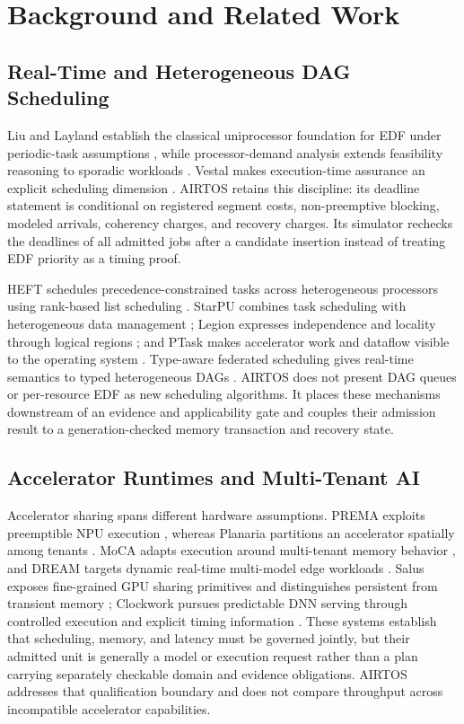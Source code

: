 \documentclass[lettersize,journal]{IEEEtran}
\begin{document}
\section{Background and Related Work}
\subsection{Real-Time and Heterogeneous DAG Scheduling}
Liu and Layland establish the classical uniprocessor foundation for EDF under
periodic-task assumptions \cite{liu1973scheduling}, while processor-demand
analysis extends feasibility reasoning to sporadic workloads
\cite{baruah1990preemptively}. Vestal makes execution-time assurance an
explicit scheduling dimension \cite{vestal2007preemptive}. AIRTOS retains this
discipline: its deadline statement is conditional on registered segment costs,
non-preemptive blocking, modeled arrivals, coherency charges, and recovery
charges. Its simulator rechecks the deadlines of all admitted jobs after a
candidate insertion instead of treating EDF priority as a timing proof.

HEFT schedules precedence-constrained tasks across heterogeneous processors
using rank-based list scheduling \cite{topcuoglu2002performanceeffective}.
StarPU combines task scheduling with heterogeneous data management
\cite{augonnet2011starpu}; Legion expresses independence and locality through
logical regions \cite{bauer2012legion}; and PTask makes accelerator work and
dataflow visible to the operating system \cite{rossbach2011ptask}. Type-aware
federated scheduling gives real-time semantics to typed heterogeneous DAGs
\cite{lin2022typeaware}. AIRTOS does not present DAG queues or per-resource EDF
as new scheduling algorithms. It places these mechanisms downstream of an
evidence and applicability gate and couples their admission result to a
generation-checked memory transaction and recovery state.

\subsection{Accelerator Runtimes and Multi-Tenant AI}
Accelerator sharing spans different hardware assumptions. PREMA exploits
preemptible NPU execution \cite{choi2020prema}, whereas Planaria partitions an
accelerator spatially among tenants \cite{ghodrati2020planaria}. MoCA adapts
execution around multi-tenant memory behavior \cite{kim2023moca}, and DREAM
targets dynamic real-time multi-model edge workloads \cite{kim2023dream}.
Salus exposes fine-grained GPU sharing primitives and distinguishes persistent
from transient memory \cite{yu2019salus}; Clockwork pursues predictable DNN
serving through controlled execution and explicit timing information
\cite{gujarati2020serving}. These systems establish that scheduling, memory,
and latency must be governed jointly, but their admitted unit is generally a
model or execution request rather than a plan carrying separately checkable
domain and evidence obligations. AIRTOS addresses that qualification boundary
and does not compare throughput across incompatible accelerator capabilities.
\end{document}
